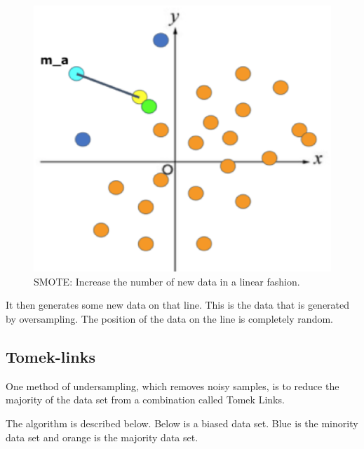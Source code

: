 \begin{center}
    \begin{figure}[ht]
        \caption{SMOTE: Increase the number of new data in a linear fashion.}
        \label{tab:team-rating-features}
        \begin{center}
            \includegraphics[scale=0.6]{image/smote5.eps}
        \end{center}
    \end{figure}
\end{center}

It then generates some new data on that line.
This is the data that is generated by oversampling.
The position of the data on the line is completely random.

\clearpage
\subsection{Tomek-links}

One method of undersampling, which removes noisy samples, is to reduce the majority of the data set from a combination called Tomek Links.

The algorithm is described below.
Below is a biased data set.
Blue is the minority data set and orange is the majority data set.

